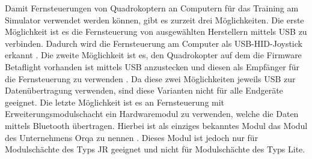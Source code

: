 Damit Fernsteuerungen von Quadrokoptern an Computern für das Training am Simulator verwendet werden können, gibt es zurzeit drei Möglichkeiten. Die erste Möglichkeit ist es die Fernsteuerung von ausgewählten Herstellern mittels USB zu verbinden. Dadurch wird die Fernsteuerung am Computer als USB-\acs{HID}-Joystick erkannt \cite{opentxJoystick}. Die zweite Möglichkeit ist es, den Quadrokopter auf dem die Firmware Betaflight vorhanden ist mittels USB anzustecken und diesen als Empfänger für die Fernsteuerung zu verwenden \cite{betaflightHID}. Da diese zwei Möglichkeiten jeweils USB zur Datenübertragung verwenden, sind diese Varianten nicht für alle Endgeräte geeignet. Die letzte Möglichkeit ist es an Fernsteuerung mit Erweiterungsmodulschacht ein Hardwaremodul zu verwenden, welche die Daten mittels Bluetooth übertragen. Hierbei ist als einziges bekanntes Modul das Modul des Unternehmens Orqa zu nennen \cite{orqaBluetoothModule}. Dieses Modul ist jedoch nur für Modulschächte des Typs JR geeignet und nicht für Modulschächte des Typs Lite.